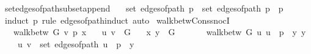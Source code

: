 \begin{isabellebody}
\endisatagproof
{\isafoldproof}%
%
\isadelimproof
\isanewline
%
\endisadelimproof
%
\isadeliminvisible
\isanewline
%
\endisadeliminvisible
%
\isataginvisible
{}\isamarkupfalse%
\ set{\isacharunderscore}{\kern0pt}edges{\isacharunderscore}{\kern0pt}of{\isacharunderscore}{\kern0pt}path{\isacharunderscore}{\kern0pt}subset{\isacharunderscore}{\kern0pt}append{\isacharcolon}{\kern0pt}\isanewline
\ \ \ {\isachardoublequoteopen}set\ {\isacharparenleft}{\kern0pt}edges{\isacharunderscore}{\kern0pt}of{\isacharunderscore}{\kern0pt}path\ p{\isacharparenright}{\kern0pt}\ {\isasymsubseteq}\ set\ {\isacharparenleft}{\kern0pt}edges{\isacharunderscore}{\kern0pt}of{\isacharunderscore}{\kern0pt}path\ {\isacharparenleft}{\kern0pt}p\ {\isacharat}{\kern0pt}\ p{\isacharprime}{\kern0pt}{\isacharparenright}{\kern0pt}{\isacharparenright}{\kern0pt}{\isachardoublequoteclose}%
\endisataginvisible
{\isafoldinvisible}%
%
\isadeliminvisible
\isanewline
%
\endisadeliminvisible
%
\isadelimproof
\ \ %
\endisadelimproof
%
\isatagproof
{}\isamarkupfalse%
\ {\isacharparenleft}{\kern0pt}induct\ p\ rule{\isacharcolon}{\kern0pt}\ edges{\isacharunderscore}{\kern0pt}of{\isacharunderscore}{\kern0pt}path{\isachardot}{\kern0pt}induct{\isacharparenright}{\kern0pt}\ auto%
\endisatagproof
{\isafoldproof}%
%
\isadelimproof
\isanewline
%
\endisadelimproof
\isanewline
{}\isamarkupfalse%
\ walk{\isacharunderscore}{\kern0pt}betw{\isacharunderscore}{\kern0pt}Cons{\isacharunderscore}{\kern0pt}snocI{\isacharcolon}{\kern0pt}\isanewline
\ \ \ {\isachardoublequoteopen}walk{\isacharunderscore}{\kern0pt}betw\ G\ v\ p\ x{\isachardoublequoteclose}\isanewline
\ \ \ {\isachardoublequoteopen}{\isacharbraceleft}{\kern0pt}u{\isacharcomma}{\kern0pt}\ v{\isacharbraceright}{\kern0pt}\ {\isasymin}\ G{\isachardoublequoteclose}\isanewline
\ \ \ {\isachardoublequoteopen}{\isacharbraceleft}{\kern0pt}x{\isacharcomma}{\kern0pt}\ y{\isacharbraceright}{\kern0pt}\ {\isasymin}\ G{\isachardoublequoteclose}\isanewline
\ \ \isanewline
\ \ \ \ {\isachardoublequoteopen}walk{\isacharunderscore}{\kern0pt}betw\ G\ u\ {\isacharparenleft}{\kern0pt}u\ {\isacharhash}{\kern0pt}\ p\ {\isacharat}{\kern0pt}\ {\isacharbrackleft}{\kern0pt}y{\isacharbrackright}{\kern0pt}{\isacharparenright}{\kern0pt}\ y{\isachardoublequoteclose}\isanewline
\ \ \ \ {\isachardoublequoteopen}{\isacharbraceleft}{\kern0pt}u{\isacharcomma}{\kern0pt}\ v{\isacharbraceright}{\kern0pt}\ {\isasymin}\ set\ {\isacharparenleft}{\kern0pt}edges{\isacharunderscore}{\kern0pt}of{\isacharunderscore}{\kern0pt}path\ {\isacharparenleft}{\kern0pt}u\ {\isacharhash}{\kern0pt}\ p\ {\isacharat}{\kern0pt}\ {\isacharbrackleft}{\kern0pt}y{\isacharbrackright}{\kern0pt}{\isacharparenright}{\kern0pt}{\isacharparenright}{\kern0pt}{\isachardoublequoteclose}\isanewline

\end{isabellebody}
